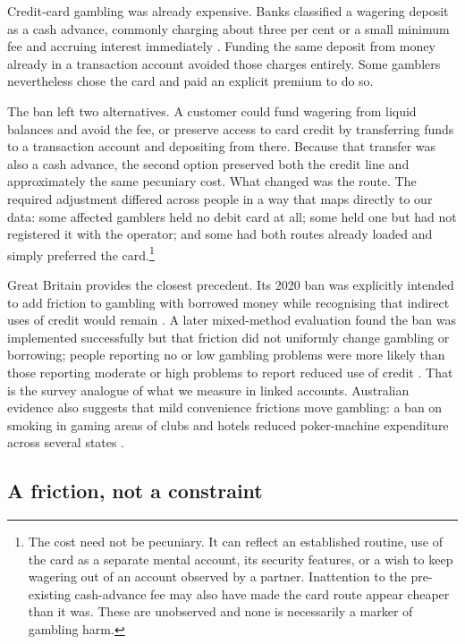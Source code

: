 \documentclass[12pt]{article}
\begin{document}
Credit-card gambling was already expensive. Banks classified a wagering deposit as a cash advance, commonly charging about three per cent or a small minimum fee and accruing interest immediately \citep{AustralianBankingAssociation2020UseCreditCardsGambling}. Funding the same deposit from money already in a transaction account avoided those charges entirely. Some gamblers nevertheless chose the card and paid an explicit premium to do so.

The ban left two alternatives. A customer could fund wagering from liquid balances and avoid the fee, or preserve access to card credit by transferring funds to a transaction account and depositing from there. Because that transfer was also a cash advance, the second option preserved both the credit line and approximately the same pecuniary cost. What changed was the route. The required adjustment differed across people in a way that maps directly to our data: some affected gamblers held no debit card at all; some held one but had not registered it with the operator; and some had both routes already loaded and simply preferred the card.\footnote{The cost need not be pecuniary. It can reflect an established routine, use of the card as a separate mental account, its security features, or a wish to keep wagering out of an account observed by a partner. Inattention to the pre-existing cash-advance fee may also have made the card route appear cheaper than it was. These are unobserved and none is necessarily a marker of gambling harm.}

Great Britain provides the closest precedent. Its 2020 ban was explicitly intended to add friction to gambling with borrowed money while recognising that indirect uses of credit would remain \citep{GamblingCommission2021_Evaluation}. A later mixed-method evaluation found the ban was implemented successfully but that friction did not uniformly change gambling or borrowing; people reporting no or low gambling problems were more likely than those reporting moderate or high problems to report reduced use of credit \citep{NatCen2024_CreditCardBan}. That is the survey analogue of what we measure in linked accounts. Australian evidence also suggests that mild convenience frictions move gambling: a ban on smoking in gaming areas of clubs and hotels reduced poker-machine expenditure across several states \citep{ProductivityCommission2010_AustraliasGamblingIndustries}.

\subsection{A friction, not a constraint}\label{sec:model}
\end{document}

